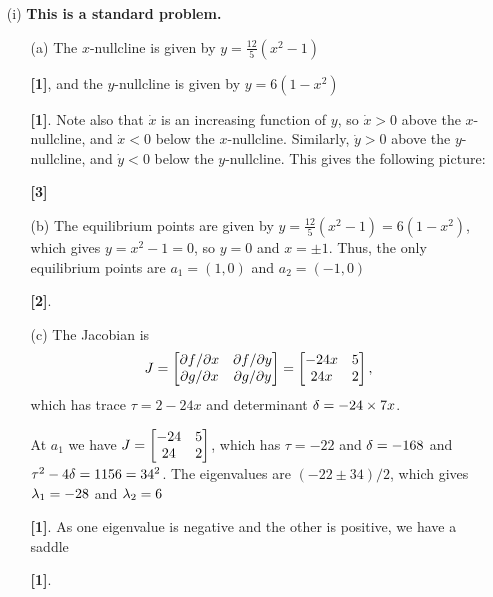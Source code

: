\documentclass[a4paper]{article}
\newcounter{probcounter}
\newcounter{marksawarded}
\newcommand{\mks}[1]{%
\addtocounter{marksawarded}{#1}%
\textbf{\color{red}[#1]}}
\newcommand{\mk}{\mks{1}}
\newenvironment{solution}{\comment}{\endcomment}
\newenvironment{solution}{
{\bigskip\par\noindent \bf Solution:}}{
\newpage
\typeout{Q\arabic{probcounter}: \arabic{marksawarded} marks awarded}
}
\begin{document}
\begin{solution}
 \begin{itemize}
  \item[(i)] \textbf{This is a standard problem.}\\
   \begin{itemize}
    \item[(a)] The $x$-nullcline is given by $y=\frac{12}{5}(x^2-1)$ \mk,
     and the $y$-nullcline is given by $y=6(1-x^2)$ \mk.  Note also that
     $\dot{x}$ is an increasing function of $y$, so $\dot{x}>0$ above
     the $x$-nullcline, and $\dot{x}<0$ below the $x$-nullcline.
     Similarly, $\dot{y}>0$ above the $y$-nullcline, and $\dot{y}<0$
     below the $y$-nullcline.  This gives the following picture:
     \begin{center}
      \mks{3}
     \end{center}
    \item[(b)] The equilibrium points are given by
     $y=\frac{12}{5}(x^2-1)=6(1-x^2)$, which gives $y=x^2-1=0$, so
     $y=0$ and $x=\pm 1$.  Thus, the only equilibrium points are
     $a_1=(1,0)$ and $a_2=(-1,0)$ \mks{2}. 
    \item[(c)] The Jacobian is
     \[ J = \left[\begin{matrix} \partial f/\partial x & 
                 \partial f/\partial y \\
                 \partial g/\partial x & 
                 \partial g/\partial y \end{matrix}\right]
          = \left[\begin{matrix} -24x & 5 \\
                 24x & 2 \end{matrix}\right],
     \]
     which has trace $\tau=2-24x$ and determinant $\delta=-24\times 7x$.

     At $a_1$ we have $J=\left[\begin{matrix} -24&5\\ 24&2\end{matrix}\right]$, which has $\tau=-22$
     and $\delta=-168$ and $\tau^2-4\delta=1156=34^2$.  The eigenvalues are
     $(-22\pm 34)/2$, which gives $\lambda_1=-28$ and $\lambda_2=6$
     \mk. As one eigenvalue is negative and the other is positive,
     we have a saddle \mk.  


\end{itemize}
\end{itemize}
\end{solution}
\end{document}
